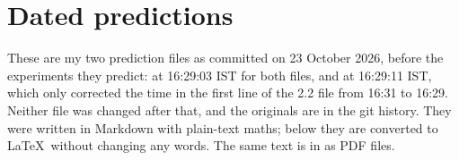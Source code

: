 \appendix
\section{Dated predictions}

These are my two prediction files as committed on 23 October 2026, before the
experiments they predict:  at 16:29:03 IST for both files, and
 at 16:29:11 IST, which only corrected the time in the first line
of the 2.2 file from 16:31 to 16:29. Neither file was changed after that, and the
originals are in the git history. They were written in Markdown with plain-text
maths; below they are converted to \LaTeX\ without changing any words. The same
text is in  as PDF files.

\small


\normalsize
